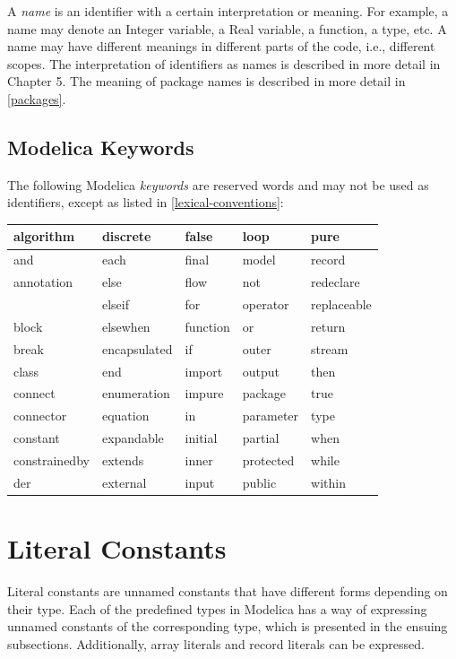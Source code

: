 \documentclass[10pt,a4paper]{report}
\def\doublelabel#1{\label{#1}}
\begin{document}
A \emph{name} is an identifier with a certain interpretation or meaning.
For example, a name may denote an Integer variable, a Real variable, a
function, a type, etc. A name may have different meanings in different
parts of the code, i.e., different scopes. The interpretation of
identifiers as names is described in more detail in Chapter 5. The
meaning of package names is described in more detail in \ref{packages}.

\subsection{Modelica Keywords}\doublelabel{modelica-keywords}

The following Modelica \emph{keywords} are reserved words and may not be
used as identifiers, except as listed in \ref{lexical-conventions}:

\begin{longtable}[c]{@{}lllll@{}}
algorithm & discrete & false & loop & pure\\ \hline
and & each & final & model & record\\ \hline
annotation & else & flow & not & redeclare\\ \hline
& elseif & for & operator & replaceable\\ \hline
block & elsewhen & function & or & return\\ \hline
break & encapsulated & if & outer & stream\\ \hline
class & end & import & output & then\\ \hline
connect & enumeration & impure & package & true\\ \hline
connector & equation & in & parameter & type\\ \hline
constant & expandable & initial & partial & when\\ \hline
constrainedby & extends & inner & protected & while\\ \hline
der & external & input & public & within\\ \hline
\end{longtable}

\section{Literal Constants}\doublelabel{literal-constants}

Literal constants are unnamed constants that have different forms
depending on their type. Each of the predefined types in Modelica has a
way of expressing unnamed constants of the corresponding type, which is
presented in the ensuing subsections. Additionally, array literals and
record literals can be expressed.
\end{document}
